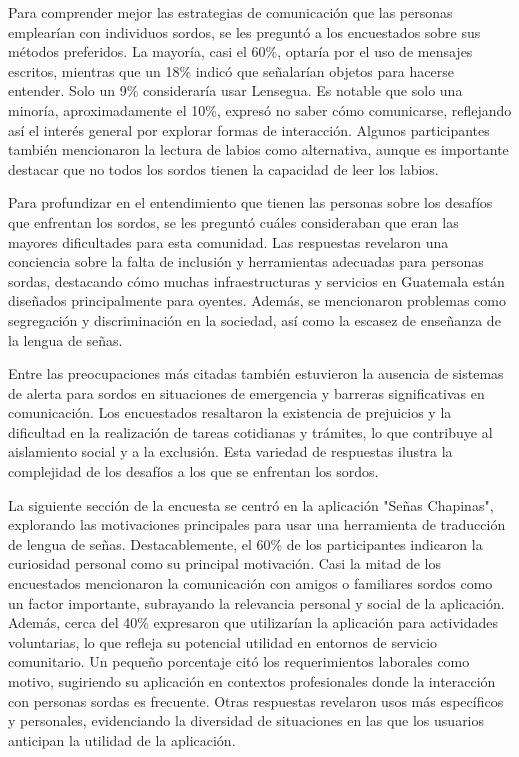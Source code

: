 Para comprender mejor las estrategias de comunicación que las personas emplearían con individuos sordos, se les preguntó a los encuestados sobre sus métodos preferidos. La mayoría, casi el 60\%, optaría por el uso de mensajes escritos, mientras que un 18\% indicó que señalarían objetos para hacerse entender. Solo un 9\% consideraría usar Lensegua. Es notable que solo una minoría, aproximadamente el 10\%, expresó no saber cómo comunicarse, reflejando así el interés general por explorar formas de interacción. Algunos participantes también mencionaron la lectura de labios como alternativa, aunque es importante destacar que no todos los sordos tienen la capacidad de leer los labios.

Para profundizar en el entendimiento que tienen las personas sobre los desafíos que enfrentan los sordos, se les preguntó cuáles consideraban que eran las mayores dificultades para esta comunidad. Las respuestas revelaron una conciencia sobre la falta de inclusión y herramientas adecuadas para personas sordas, destacando cómo muchas infraestructuras y servicios en Guatemala están diseñados principalmente para oyentes. Además, se mencionaron problemas como segregación y discriminación en la sociedad, así como la escasez de enseñanza de la lengua de señas.

Entre las preocupaciones más citadas también estuvieron la ausencia de sistemas de alerta para sordos en situaciones de emergencia y barreras significativas en comunicación. Los encuestados resaltaron la existencia de prejuicios y la dificultad en la realización de tareas cotidianas y trámites, lo que contribuye al aislamiento social y a la exclusión. Esta variedad de respuestas ilustra la complejidad de los desafíos a los que se enfrentan los sordos. 

La siguiente sección de la encuesta se centró en la aplicación "Señas Chapinas", explorando las motivaciones principales para usar una herramienta de traducción de lengua de señas. Destacablemente, el 60\% de los participantes indicaron la curiosidad personal como su principal motivación. Casi la mitad de los encuestados mencionaron la comunicación con amigos o familiares sordos como un factor importante, subrayando la relevancia personal y social de la aplicación. Además, cerca del 40\% expresaron que utilizarían la aplicación para actividades voluntarias, lo que refleja su potencial utilidad en entornos de servicio comunitario. Un pequeño porcentaje citó los requerimientos laborales como motivo, sugiriendo su aplicación en contextos profesionales donde la interacción con personas sordas es frecuente. Otras respuestas revelaron usos más específicos y personales, evidenciando la diversidad de situaciones en las que los usuarios anticipan la utilidad de la aplicación.

